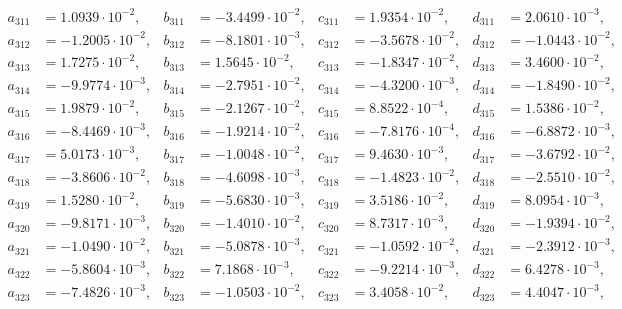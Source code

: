 \begin{align*}
  a_{ 311 } &= 1.0939 \cdot 10^{ -2 }, & b_{ 311 } &= -3.4499 \cdot 10^{ -2 }, & c_{ 311 } &= 1.9354 \cdot 10^{ -2 }, & d_{ 311 } &= 2.0610 \cdot 10^{ -3 }, \\ 
  a_{ 312 } &= -1.2005 \cdot 10^{ -2 }, & b_{ 312 } &= -8.1801 \cdot 10^{ -3 }, & c_{ 312 } &= -3.5678 \cdot 10^{ -2 }, & d_{ 312 } &= -1.0443 \cdot 10^{ -2 }, \\ 
  a_{ 313 } &= 1.7275 \cdot 10^{ -2 }, & b_{ 313 } &= 1.5645 \cdot 10^{ -2 }, & c_{ 313 } &= -1.8347 \cdot 10^{ -2 }, & d_{ 313 } &= 3.4600 \cdot 10^{ -2 }, \\ 
  a_{ 314 } &= -9.9774 \cdot 10^{ -3 }, & b_{ 314 } &= -2.7951 \cdot 10^{ -2 }, & c_{ 314 } &= -4.3200 \cdot 10^{ -3 }, & d_{ 314 } &= -1.8490 \cdot 10^{ -2 }, \\ 
  a_{ 315 } &= 1.9879 \cdot 10^{ -2 }, & b_{ 315 } &= -2.1267 \cdot 10^{ -2 }, & c_{ 315 } &= 8.8522 \cdot 10^{ -4 }, & d_{ 315 } &= 1.5386 \cdot 10^{ -2 }, \\ 
  a_{ 316 } &= -8.4469 \cdot 10^{ -3 }, & b_{ 316 } &= -1.9214 \cdot 10^{ -2 }, & c_{ 316 } &= -7.8176 \cdot 10^{ -4 }, & d_{ 316 } &= -6.8872 \cdot 10^{ -3 }, \\ 
  a_{ 317 } &= 5.0173 \cdot 10^{ -3 }, & b_{ 317 } &= -1.0048 \cdot 10^{ -2 }, & c_{ 317 } &= 9.4630 \cdot 10^{ -3 }, & d_{ 317 } &= -3.6792 \cdot 10^{ -2 }, \\ 
  a_{ 318 } &= -3.8606 \cdot 10^{ -2 }, & b_{ 318 } &= -4.6098 \cdot 10^{ -3 }, & c_{ 318 } &= -1.4823 \cdot 10^{ -2 }, & d_{ 318 } &= -2.5510 \cdot 10^{ -2 }, \\ 
  a_{ 319 } &= 1.5280 \cdot 10^{ -2 }, & b_{ 319 } &= -5.6830 \cdot 10^{ -3 }, & c_{ 319 } &= 3.5186 \cdot 10^{ -2 }, & d_{ 319 } &= 8.0954 \cdot 10^{ -3 }, \\ 
  a_{ 320 } &= -9.8171 \cdot 10^{ -3 }, & b_{ 320 } &= -1.4010 \cdot 10^{ -2 }, & c_{ 320 } &= 8.7317 \cdot 10^{ -3 }, & d_{ 320 } &= -1.9394 \cdot 10^{ -2 }, \\ 
  a_{ 321 } &= -1.0490 \cdot 10^{ -2 }, & b_{ 321 } &= -5.0878 \cdot 10^{ -3 }, & c_{ 321 } &= -1.0592 \cdot 10^{ -2 }, & d_{ 321 } &= -2.3912 \cdot 10^{ -3 }, \\ 
  a_{ 322 } &= -5.8604 \cdot 10^{ -3 }, & b_{ 322 } &= 7.1868 \cdot 10^{ -3 }, & c_{ 322 } &= -9.2214 \cdot 10^{ -3 }, & d_{ 322 } &= 6.4278 \cdot 10^{ -3 }, \\ 
  a_{ 323 } &= -7.4826 \cdot 10^{ -3 }, & b_{ 323 } &= -1.0503 \cdot 10^{ -2 }, & c_{ 323 } &= 3.4058 \cdot 10^{ -2 }, & d_{ 323 } &= 4.4047 \cdot 10^{ -3 }, \\ 

\end{align*}
